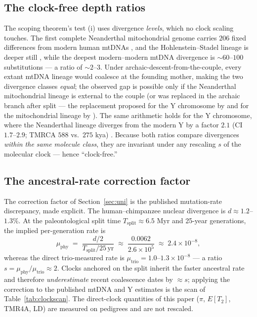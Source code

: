 \subsection{The clock-free depth ratios}\label{app:ratios}
The scoping theorem's test (i) uses divergence \emph{levels}, which no
clock scaling touches. The first complete Neanderthal mitochondrial genome
carries $206$ fixed differences from modern human mtDNAs
\citep{Green2008}, and the Hohlenstein--Stadel lineage is deeper still
\citep{Posth2017}, while the deepest modern--modern mtDNA divergence is
$\sim$$60$--$100$ substitutions --- a ratio of $\sim$$2$--$3$. Under
archaic-descent-from-the-couple, every extant mtDNA lineage would
coalesce at the founding mother, making the two divergence classes
\emph{equal}; the observed gap is possible only if the
Neanderthal mitochondrial lineage is external to the couple (or was
replaced in the archaic branch after split --- the replacement proposed
for the Y chromosome by \citealp{Mendez2016} and for the mitochondrial
lineage by \citealp{Posth2017}). The same arithmetic holds
for the Y chromosome, where the Neanderthal lineage diverges from the
modern Y by a factor $2.1$ (CI $1.7$--$2.9$; TMRCA $588$ vs.\ $275$ kya)
\citep{Mendez2016}. Because
both ratios compare divergences \emph{within the same molecule class},
they are invariant under any rescaling $s$ of the molecular clock ---
hence ``clock-free.''

\subsection{The ancestral-rate correction factor}\label{app:sfactor}
The correction factor of Section~\ref{sec:uni} is the published
mutation-rate discrepancy, made explicit. The human--chimpanzee nuclear
divergence is $d \approx 1.2$--$1.3\%$. At the paleontological split
time $T_{\mathrm{split}} \approx 6.5$ Myr and 25-year generations, the
implied per-generation rate is
\begin{equation}\label{eq:muphy}
\mu_{\mathrm{phy}} \;=\; \frac{d/2}{T_{\mathrm{split}}/25\,\mathrm{yr}}
\;\approx\; \frac{0.0062}{2.6\times10^{5}}
\;\approx\; 2.4\times10^{-8},
\end{equation}
whereas the direct trio-measured rate is
$\mu_{\mathrm{trio}} = 1.0$--$1.3\times10^{-8}$
\citep{Scally2012,Jonsson2017} --- a ratio
$s = \mu_{\mathrm{phy}}/\mu_{\mathrm{trio}} \approx 2$. Clocks anchored
on the split inherit the faster ancestral rate and therefore
\emph{underestimate} recent coalescence dates by $\approx s$; applying
the correction to the published mtDNA and Y estimates is the scan of
Table~\ref{tab:clockscan}. The direct-clock quantities of this paper
($\pi$, $E[T_2]$, TMR4A, LD) are measured on pedigrees and are not
rescaled.

